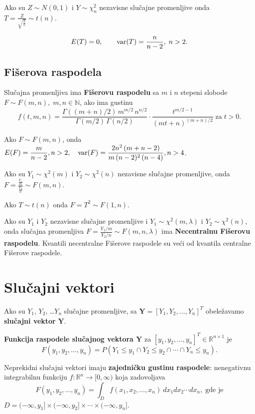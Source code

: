 \documentclass[twoside,titlepage,12pt,a4paper]{book}
\def\R{\mathbb{R}}
\def\N{\mathbb{N}}
\def\var{\mathop{\rm var}\nolimits}
\numberwithin{equation}{chapter}
\begin{document}
Ako su $Z \sim N ( 0, 1 )$ i $Y \sim \chi_n^2$ nezavisne
slučajne promenljive onda
$\displaystyle T = \frac{Z}{\sqrt{\frac{Y}{n}}} \sim t ( n )$.

\[E ( T ) = 0, \quad\quad \var ( T ) = \frac{n}{n -2},\; n > 2. \]

\subsection{Fišerova raspodela}

Slučajna promenljiva ima \textbf{Fišerovu raspodelu} sa $m$ i $n$ stepeni slobode $\displaystyle F \sim F ( m, n ),\; m, n \in \N$, ako ima gustinu\\
$$f ( t, m, n ) = 
\frac{\Gamma ( (m+n) / 2) \, m^{m/2} \, n^{n/2}}%
{\Gamma ( m/2 ) \, \Gamma ( n / 2)} \cdot
\frac{t^{m/2-1}}{( m t + n )^{(m+n)/2}}
\;\mbox{za}\; t > 0.$$

Ako \(\displaystyle F \sim F ( m, n )\), onda 
$\displaystyle E ( F ) = \frac{m}{n - 2}, n > 2, \quad
\var ( F ) = \frac{2 n^2 \, ( m + n - 2)}{m \, ( n - 2 )^2 \, ( n - 4 )}, n > 4$.

Ako su $Y_1 \sim  \chi^2 ( m )$ i $Y_2 \sim \chi^2 ( n )$ nezavisne
slučajne promenljive, onda
\(\displaystyle F = \frac{\frac{Y_1}{m}}{\frac{Y_2}{n}} \sim F ( m, n )\).

Ako $T \sim  t ( n )$ onda
\(\displaystyle F = T^2 \sim F ( 1, n )\).

Ako su $Y_1$ i $Y_2$ nezavisne slučajne promenljive i
$Y_1 \sim \chi^2 ( m, \lambda )$ i $Y_2 \sim \chi^2 ( n )$,
onda slučajna promenljiva
\(\displaystyle
F = \frac{Y_1 / m}{Y_2 / n} \sim F ( m, n, \lambda )\)
ima \textbf{Necentralnu Fišerovu raspodelu}. Kvantili necentralne Fišerove
raspodele su veći od kvantila centralne Fišerove raspodele.


\section{Slučajni vektori}

Ako su $Y_1$, $Y_2$, \ldots $Y_n$ slučajne promenljive, 
sa $\mathbf{Y} = [ Y_1, Y_2, \ldots, Y_n ]^T$ obeležavamo
\textbf{slučajni vektor} $\mathbf{Y}$.

\textbf{Funkcija raspodele slučajnog vektora $\mathbf{Y}$} za $[ y_1, y_2, \ldots, y_n ]^T \in \R^{n\times1}$ je 
\[
F ( y_1, y_2, \ldots, y_n ) = P ( Y_1 \le y_1 \cap Y_2 \le y_2 \cap \cdots \cap Y_n \le y_n).
\]

Neprekidni slučajni vektori imaju \textbf{zajedničku gustinu raspodele}: nenegativnu integrabilnu funkciju $f : \R^n \rightarrow [ 0, \infty )$ koja zadovoljava
\[
F ( y_1, y_2, \ldots, y_n ) = \int_D  f ( x_1, x_2, \ldots, x_n) \: dx_1 dx_2 \cdots dx_n, \;\mbox{gde je}
\]
$\displaystyle D = ( -\infty, y_1 ] \times  ( -\infty, y_2 ] \times  \cdots \times  ( -\infty, y_n ]$.
\end{document}
